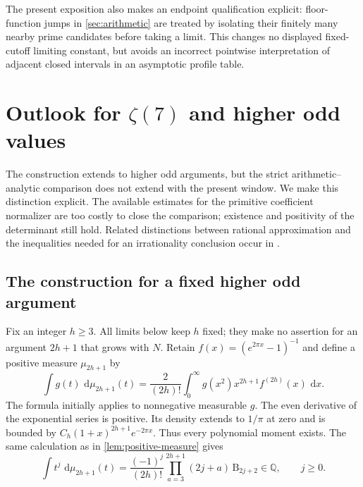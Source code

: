 \documentclass[11pt,letterpaper]{article}
\theoremstyle{definition}
\newcommand{\Q}{\mathbb Q}
\newcommand{\dd}{\,\mathrm d}
\begin{document}
The present exposition also makes an endpoint qualification explicit:
floor-function jumps in \cref{sec:arithmetic} are treated by isolating
their finitely many nearby prime candidates before taking a limit.
This changes no displayed fixed-cutoff limiting constant, but avoids an incorrect
pointwise interpretation of adjacent closed intervals in an asymptotic
profile table.


\section{Outlook for \texorpdfstring{$\zeta(7)$}{zeta(7)} and higher odd values}\label{sec:higher-odd}

The construction extends to higher odd arguments, but the strict
arithmetic--analytic comparison does not extend with the present window.
We make this distinction explicit. The available estimates for the primitive
coefficient normalizer are too costly to close the comparison; existence and
positivity of the determinant still hold. Related distinctions between rational approximation and the
inequalities needed for an irrationality conclusion occur in
\cite{prevostrivoal2021,zudilin2017}.

\subsection{The construction for a fixed higher odd argument}

Fix an integer $h\ge3$. All limits below keep $h$ fixed; they make no
assertion for an argument $2h+1$ that grows with $N$. Retain
$f(x)=(e^{2\pi x}-1)^{-1}$ and define a positive measure $\mu_{2h+1}$ by
\begin{equation}\label{eq:higher-measure}
 \int g(t)\,\dd\mu_{2h+1}(t)
 =\frac{2}{(2h)!}\int_0^\infty
       g(x^2)x^{2h+1}f^{(2h)}(x)\,\dd x.
\end{equation}
The formula initially applies to nonnegative measurable $g$.
The even derivative of the exponential series is positive. Its density
extends to $1/\pi$ at zero and is bounded by
$C_h(1+x)^{2h+1}e^{-2\pi x}$. Thus every polynomial moment exists.
The same calculation as in \cref{lem:positive-measure} gives
\begin{equation}\label{eq:higher-moments}
 \int t^j\,\dd\mu_{2h+1}(t)
 =\frac{(-1)^j}{(2h)!}
       \prod_{a=3}^{2h+1}(2j+a)\,\mathrm B_{2j+2}
 \in\Q,\qquad j\ge0.
\end{equation}
\end{document}
